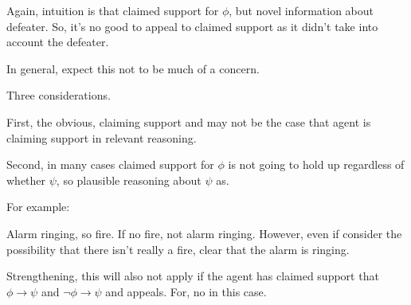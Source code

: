 \begin{note}
  Again, intuition is that claimed support for \(\phi\), but novel information about defeater.
  So, it's no good to appeal to claimed support as it didn't take into account the defeater.
\end{note}

\begin{note}
  In general, expect this not to be much of a concern.

  Three considerations.
\end{note}

\begin{note}
  First, the obvious, claiming support and may not be the case that agent is claiming support in relevant reasoning.
\end{note}


\begin{note}
  Second, in many cases claimed support for \(\phi\) is not going to hold up regardless of whether \(\psi\), so plausible reasoning about \(\psi\) as\requ{}.

  For example:

  Alarm ringing, so fire.
  If no fire, not alarm ringing.
  However, even if consider the possibility that there isn't really a fire, clear that the alarm is ringing.
\end{note}

\begin{note}
  Strengthening, this will also not apply if the agent has claimed support that \(\phi \rightarrow \psi\) and \(\lnot \phi \rightarrow \psi\) and appeals.
  For, no \requ{} in this case.
\end{note}

